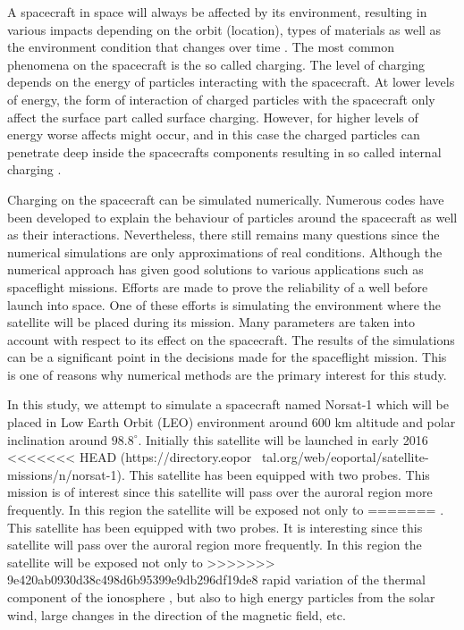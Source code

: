 

A spacecraft in space will always be affected by its environment, resulting in various
impacts depending on the orbit (location), types of materials as well as the environment
condition that changes over time \citep{trove.nla.gov.au/work/21680840}. The  most common phenomena on the spacecraft is the so
called charging. The level of charging depends on the energy of particles interacting with
the spacecraft. At lower levels of energy, the form of interaction of charged particles with the
spacecraft only affect the surface part called surface charging. However, for higher levels of energy
worse affects might occur, and in this case the charged particles
can penetrate deep inside the spacecrafts components resulting in so called internal charging \citep{fennell2001spacecraft}.

Charging on the spacecraft can be simulated numerically. Numerous codes have been developed
to explain the behaviour of particles around the spacecraft as well as their interactions.
Nevertheless, there still remains many questions since the numerical simulations are only approximations
of real conditions. Although the numerical approach has given good solutions to various applications
such as spaceflight missions. Efforts are made to prove the reliability of a well before launch into space.
One of these efforts is simulating the environment where the satellite will be placed during its mission.
Many parameters are taken into account with respect to its effect on the spacecraft.
The results of the simulations can be a significant point in the decisions made for the spaceflight
mission. This is one of reasons why numerical methods are the primary interest for this study.

In this study, we attempt to simulate a spacecraft named Norsat-1 which will be placed in
Low Earth Orbit (LEO) environment around 600 km altitude and polar inclination around \(98.8^\circ\).
Initially this satellite will be launched in early 2016
<<<<<<< HEAD
(https://directory.eopor~ tal.org/web/eoportal/satellite-missions/n/norsat-1). This satellite
has been equipped with two probes. This mission is of interest since this satellite will pass over
the auroral region more frequently. In this region the satellite will be exposed not only to
=======
\citep{norSat}. This satellite
has been equipped with two probes. It is interesting since this satellite will pass over
the auroral region more frequently. In this region  the satellite will be exposed not only to
>>>>>>> 9e420ab0930d38c498d6b95399e9db296df19de8
rapid variation of the thermal component of the ionosphere \citep{hastings1995review}, but also to high
energy particles from the solar wind, large changes in the direction of the magnetic field, etc.

